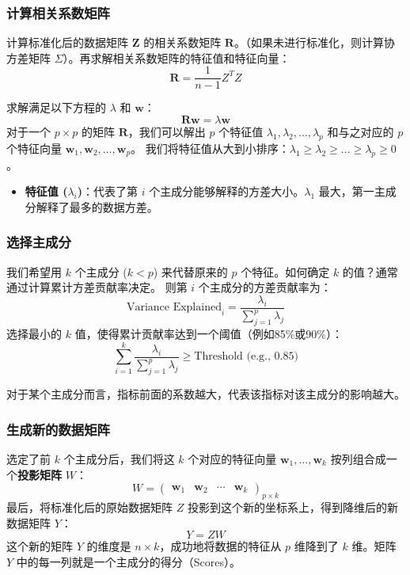 \subsubsection{计算相关系数矩阵}

计算标准化后的数据矩阵 $\mathbf{Z}$ 的相关系数矩阵 $\mathbf{R}$。（如果未进行标准化，则计算协方差矩阵 $\Sigma$）。再求解相关系数矩阵的特征值和特征向量：
\[
    \mathbf{R} = \frac{1}{n-1} Z^T Z
\]

求解满足以下方程的 $\lambda$ 和 $\mathbf{w}$：
\[
    \mathbf{R} \mathbf{w} = \lambda \mathbf{w}
\]
对于一个 $p \times p$ 的矩阵 $\mathbf{R}$，我们可以解出 $p$ 个特征值 $\lambda_1, \lambda_2, \ldots, \lambda_p$ 和与之对应的 $p$ 个特征向量 $\mathbf{w}_1, \mathbf{w}_2, \ldots, \mathbf{w}_p$。
我们将特征值从大到小排序：$\lambda_1 \ge \lambda_2 \ge \ldots \ge \lambda_p \ge 0$。
\begin{itemize}
    \item \textbf{特征值 ($\lambda_i$)}：代表了第 $i$ 个主成分能够解释的方差大小。$\lambda_1$ 最大，第一主成分解释了最多的数据方差。
\end{itemize}

\subsubsection{选择主成分}

我们希望用 $k$ 个主成分 ($k < p$) 来代替原来的 $p$ 个特征。如何确定 $k$ 的值？通常通过计算累计方差贡献率决定。
则第 $i$ 个主成分的方差贡献率为：
\[
    \text{Variance Explained}_i = \frac{\lambda_i}{\sum_{j=1}^p \lambda_j}
\]
选择最小的 $k$ 值，使得累计贡献率达到一个阈值（例如85\%或90\%）：
\[
    \sum_{i=1}^k \frac{\lambda_i}{\sum_{j=1}^p \lambda_j} \ge \text{Threshold (e.g., 0.85)}
\]

\begin{tips}
    对于某个主成分而言，指标前面的系数越大，代表该指标对该主成分的影响越大。
\end{tips}

\subsubsection{生成新的数据矩阵}

选定了前 $k$ 个主成分后，我们将这 $k$ 个对应的特征向量 $\mathbf{w}_1, \ldots, \mathbf{w}_k$ 按列组合成一个\textbf{投影矩阵} $W$：
\[
    W = \begin{pmatrix} \mathbf{w}_1 & \mathbf{w}_2 & \cdots & \mathbf{w}_k \end{pmatrix}_{p \times k}
\]
最后，将标准化后的原始数据矩阵 $Z$ 投影到这个新的坐标系上，得到降维后的新数据矩阵 $Y$：
\[
    Y = ZW
\]
这个新的矩阵 $Y$ 的维度是 $n \times k$，成功地将数据的特征从 $p$ 维降到了 $k$ 维。矩阵 $Y$ 中的每一列就是一个主成分的得分（Scores）。

